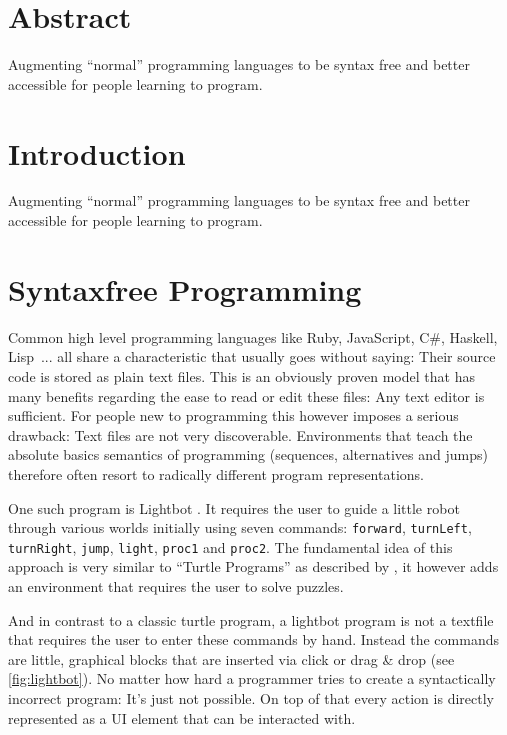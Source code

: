 \section{Abstract}
\label{sec:abstract}

Augmenting \enquote{normal} programming languages to be syntax free and better accessible for people learning to program.


\section{Introduction}
\label{sec:introduction}

Augmenting \enquote{normal} programming languages to be syntax free and better accessible for people learning to program.

\section{Syntaxfree Programming}
\label{sec:syntaxfree-programming}

Common high level programming languages like Ruby, JavaScript, C\#, Haskell, Lisp~... all share a characteristic that usually goes without saying: Their source code is stored as plain text files. This is an obviously proven model that has many benefits regarding the ease to read or edit these files: Any text editor is sufficient. For people new to programming this however imposes a serious drawback: Text files are not very discoverable. Environments that teach the absolute basics semantics of programming (sequences, alternatives and jumps) therefore often resort to radically different program representations.

One such program is Lightbot \cite{yaroslavski_lightbot}. It requires the user to guide a little robot through various worlds initially using seven commands: \texttt{forward}, \texttt{turnLeft}, \texttt{turnRight}, \texttt{jump}, \texttt{light}, \texttt{proc1} and \texttt{proc2}. The fundamental idea of this approach is very similar to \enquote{Turtle Programs} as described by \cite{papert_mindstorms_1982}, it however adds an environment that requires the user to solve puzzles.

And in contrast to a classic turtle program, a lightbot program is not a textfile that requires the user to enter these commands by hand. Instead the commands are little, graphical blocks that are inserted via click or drag \& drop (see \autoref{fig:lightbot}). No matter how hard a programmer tries to create a syntactically incorrect program: It's just not possible. On top of that every action is directly represented as a UI element that can be interacted with.

